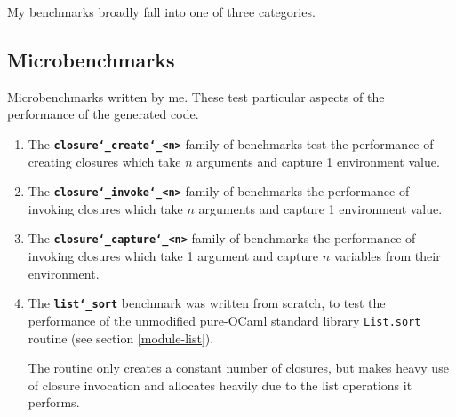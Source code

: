 \documentclass[12pt,a4paper,twoside,openright]{report}
\begin{document}
My benchmarks broadly fall into one of three categories.

\subsection{Microbenchmarks}
Microbenchmarks written by me. These test particular aspects of the
performance of the generated code.

\begin{enumerate}
  \item
    The \textbf{\texttt{closure\char`_create\char`_<n>}} family of benchmarks test the performance of
    creating closures which take $n$ arguments and capture 1 environment value.

  \item
    The \textbf{\texttt{closure\char`_invoke\char`_<n>}} family of benchmarks the performance of
    invoking closures which take $n$ arguments and capture 1 environment value.

  \item
    The \textbf{\texttt{closure\char`_capture\char`_<n>}} family of benchmarks the performance
    of invoking closures which take 1 argument and capture $n$ variables from their environment.

  \item

  The \textbf{\texttt{list\char`_sort}} benchmark was written from scratch, to test the
  performance of the unmodified pure-OCaml standard library \lstinline!List.sort!
  routine (see section \ref{module-list}).

  The routine only creates a constant number of closures, but makes heavy use of
  closure invocation and allocates heavily due to the list operations it
  performs.
\end{enumerate}
\end{document}
